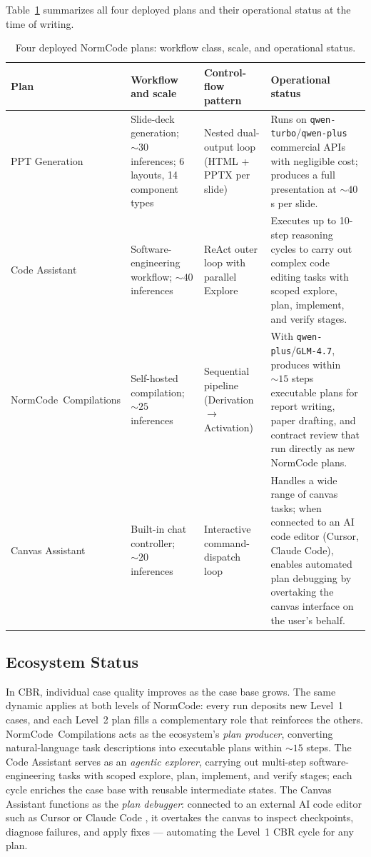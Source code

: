 Table~\ref{tab:cases} summarizes all four deployed plans and their operational status
at the time of writing.

\begin{table}[!htbp]
  \centering
  \scriptsize
  \setlength{\tabcolsep}{3pt}
  \caption{Four deployed NormCode plans: workflow class, scale, and operational status.}
  \label{tab:cases}
  \begin{tabular}{p{1.7cm}p{2.4cm}p{2.6cm}p{4.4cm}}
    \toprule
    Plan & Workflow and scale & Control-flow pattern & Operational status \\
    \midrule
    PPT Generation & Slide-deck generation; ${\sim}30$ inferences; 6 layouts, 14 component types & Nested dual-output loop (HTML + PPTX per slide) & Runs on \texttt{qwen-turbo}/\texttt{qwen-plus} commercial APIs with negligible cost; produces a full presentation at ${\sim}40$\,s per slide. \\
    Code Assistant & Software-engineering workflow; ${\sim}40$ inferences & ReAct outer loop with parallel Explore & Executes up to 10-step reasoning cycles to carry out complex code editing tasks with scoped explore, plan, implement, and verify stages. \\
    NormCode~Compilations & Self-hosted compilation; ${\sim}25$ inferences & Sequential pipeline (Derivation $\rightarrow$ Activation) & With \texttt{qwen-plus}/\texttt{GLM-4.7}, produces within ${\sim}15$ steps executable plans for report writing, paper drafting, and contract review that run directly as new NormCode plans. \\
    Canvas Assistant & Built-in chat controller; ${\sim}20$ inferences & Interactive command-dispatch loop & Handles a wide range of canvas tasks; when connected to an AI code editor (Cursor, Claude Code), enables automated plan debugging by overtaking the canvas interface on the user's behalf. \\
    \bottomrule
  \end{tabular}
\end{table}

\subsection{Ecosystem Status}

In CBR, individual case quality improves as the case base grows. The same dynamic
applies at both levels of NormCode: every run deposits new Level~1 cases, and each
Level~2 plan fills a complementary role that reinforces the others.
NormCode~Compilations acts as the ecosystem's \textit{plan producer}, converting
natural-language task descriptions into executable plans within ${\sim}15$ steps.
The Code Assistant serves as an \textit{agentic explorer}, carrying out multi-step
software-engineering tasks with scoped explore, plan, implement, and verify stages;
each cycle enriches the case base with reusable intermediate states. The Canvas
Assistant functions as the \textit{plan debugger}: connected to an external AI code
editor such as Cursor \cite{cursor2024} or Claude Code \cite{claudecode2026}, it
overtakes the canvas to inspect checkpoints, diagnose failures, and apply fixes ---
automating the Level~1 CBR cycle for any plan.

